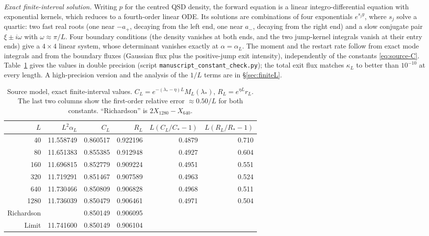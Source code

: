 \documentclass[11pt,a4paper]{article}
\theoremstyle{definition}
\theoremstyle{remark}
\newcommand{\1}{\mathbf 1}
\begin{document}
\emph{Exact finite-interval solution.} Writing $p$ for the centred QSD density, the forward equation is a linear integro-differential equation with exponential kernels, which reduces to a fourth-order linear ODE. Its solutions are combinations of four exponentials $e^{s_jy}$, where $s_j$ solve a quartic: two fast real roots (one near $-a_+$, decaying from the left end, one near $a_-$, decaying from the right end) and a slow conjugate pair $\xi\pm i\omega$ with $\omega\approx\pi/L$. Four boundary conditions (the density vanishes at both ends, and the two jump-kernel integrals vanish at their entry ends) give a $4\times4$ linear system, whose determinant vanishes exactly at $\alpha=\alpha_L$. The moment and the restart rate follow from exact mode integrals and from the boundary fluxes (Gaussian flux plus the positive-jump exit intensity), independently of the constants \eqref{eq:source-C}. Table~\ref{tab:finiteL} gives the values in double precision (script \texttt{manuscript\_constant\_check.py}); the total exit flux matches $\kappa_L$ to better than $10^{-10}$ at every length. A high-precision version and the analysis of the $1/L$ terms are in \S\ref{sec:finiteL}.

\begin{table}[h]
\centering\small
\caption{Source model, exact finite-interval values. $C_L=e^{-(\lambda_*-\eta)L}M_L(\lambda_*)$, $R_L=e^{\eta L}r_L$. The last two columns show the first-order relative error $\approx0.50/L$ for both constants. ``Richardson'' is $2X_{1280}-X_{640}$.}\label{tab:finiteL}
\begin{tabular}{@{}rrrrrr@{}}
\toprule
$L$ & $L^2\alpha_L$ & $C_L$ & $R_L$ & $L(C_L/C_*-1)$ & $L(R_L/R_*-1)$\\
\midrule
40 & 11.558749 & 0.860517 & 0.922196 & 0.4879 & 0.710\\
80 & 11.651383 & 0.855385 & 0.912948 & 0.4927 & 0.604\\
160 & 11.696815 & 0.852779 & 0.909224 & 0.4951 & 0.551\\
320 & 11.719291 & 0.851467 & 0.907589 & 0.4963 & 0.524\\
640 & 11.730466 & 0.850809 & 0.906828 & 0.4968 & 0.511\\
1280 & 11.736039 & 0.850479 & 0.906461 & 0.4971 & 0.504\\
\midrule
Richardson & & 0.850149 & 0.906095 & &\\
Limit & 11.741600 & 0.850149 & 0.906104 & &\\
\bottomrule
\end{tabular}
\end{table}
\end{document}

